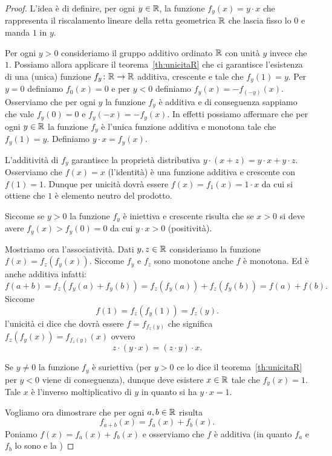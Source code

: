 \begin{proof}
L'idea è di definire, per ogni $y\in \mathbb R$, la funzione $f_y(x) = y\cdot x$
che rappresenta il riscalamento lineare della retta geometrica $\mathbb R$ 
che lascia fisso lo $0$ e manda $1$ in $y$. 

Per ogni $y>0$ consideriamo il gruppo additivo ordinato $\mathbb R$ con unità $y$ invece 
che $1$. Possiamo allora applicare il teorema~\ref{th:unicitaR}
che ci garantisce l'esistenza di una (unica) funzione $f_y\colon \mathbb R\to\mathbb R$ 
additiva, crescente e tale che $f_y(1)=y$.
Per $y=0$ definiamo $f_0(x) = 0$ e per $y<0$ definiamo $f_y(x) = -f_(-y)(x)$.
Osserviamo che per ogni $y$ la funzione $f_y$ è additiva e di conseguenza 
sappiamo che vale $f_y(0) = 0$ e $f_y(-x)=-f_y(x)$.
In effetti possiamo affermare che per ogni $y\in \mathbb R$ la funzione $f_y$ 
è l'unica funzione additiva e monotona
tale che $f_y(1)=y$.
Definiamo $y\cdot x = f_y(x)$.

L'additività di $f_y$ garantisce la proprietà distributiva 
$y\cdot(x+z) = y\cdot x + y\cdot z$.
Osserviamo che $f(x)=x$ (l'identità) è una funzione additiva e crescente con $f(1)=1$.
Dunque per unicità dovrà essere $f(x) = f_1(x) = 1\cdot x$ 
da cui si ottiene che $1$ è elemento neutro del prodotto.

Siccome se $y>0$ la funzione $f_y$ è iniettiva e crescente risulta che se $x>0$ 
si deve avere $f_y(x) > f_y(0)=0$ da cui $y\cdot x > 0$ (positività).

Mostriamo ora l'associatività. 
Dati $y,z\in \mathbb R$ 
consideriamo la funzione $f(x)=f_z(f_y(x))$.
Siccome $f_y$ e $f_z$ sono monotone anche $f$ è monotona.
Ed è anche additiva infatti:
\[
  f(a+b) = f_z(f_y(a)+f_y(b)) = f_z(f_y(a)) + f_z(f_y(b)) = f(a)+f(b).
\]
Siccome 
\[
  f(1) = f_z(f_y(1)) = f_z(y).
\]
l'unicità ci dice che dovrà essere $f = f_{f_z(y)}$ che significa
$f_z(f_y(x)) = f_{f_z(y)}(x)$ ovvero
\[
  z\cdot(y\cdot x) = (z\cdot y)\cdot x.
\]

Se $y\neq 0$ la funzione $f_y$ è suriettiva (per $y>0$ ce lo dice 
il teorema~\ref{th:unicitaR} per $y<0$ viene di conseguenza), 
dunque deve esistere $x\in \mathbb R$ tale che $f_y(x)=1$.
Tale $x$ è l'inverso moltiplicativo di $y$ in quanto si ha $y\cdot x = 1$.

Vogliamo ora dimostrare che per ogni $a,b\in \mathbb R$ risulta 
\[
 f_{a+b}(x) = f_a(x) + f_b(x).  
\]
Poniamo $f(x) = f_a(x) + f_b(x)$ e osserviamo che $f$ è additiva (in quanto $f_a$ e $f_b$ 
lo sono e la )

\end{proof}

